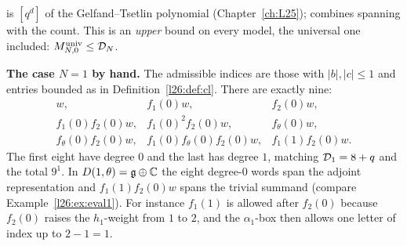 \begin{dictionary}
 is $[q^d]$ of the Gelfand--Tsetlin polynomial 
(Chapter~\ref{ch:L25});  combines spanning with the count. This is an \emph{upper} bound on every
model, the universal one included: $M^{\mathrm{univ}}_{N,0}\le\mathcal D_N$.
\end{dictionary}

\textbf{The case $N=1$ by hand.} The admissible indices are those with $|b|,|c|\le1$ and entries bounded as in
Definition~\ref{l26:def:cl}. There are exactly nine:
\begin{equation*}
\begin{array}{lll}
w, & f_1(0)w, & f_2(0)w,\\
f_1(0)f_2(0)w, & f_1(0)^2f_2(0)w, & f_\theta(0)w,\\
f_\theta(0)f_2(0)w, & f_1(0)f_\theta(0)f_2(0)w, & f_1(1)f_2(0)w .
\end{array}
\end{equation*}
The first eight have degree $0$ and the last has degree $1$, matching $\mathcal D_1=8+q$ and the total $9^1$. In
$D(1,\theta)=\mathfrak g\oplus{\mathbb{C}}$ the eight degree-$0$ words span the adjoint representation and $f_1(1)f_2(0)w$ spans the trivial
summand (compare Example~\ref{l26:ex:eval1}). For instance $f_1(1)$ is allowed after $f_2(0)$ because $f_2(0)$ raises the $h_1$-weight
from $1$ to $2$, and the $\alpha_1$-box then allows one letter of index up to $2-1=1$.

